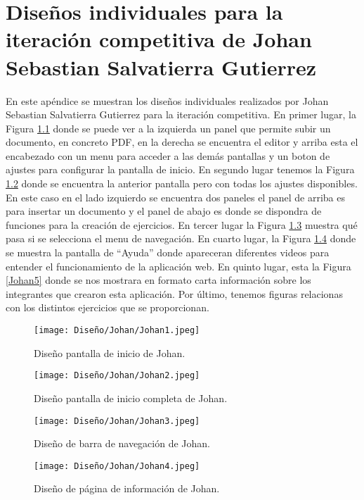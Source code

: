 \chapter{Diseños individuales para la iteración competitiva de Johan Sebastian Salvatierra Gutierrez}
\label{ape:disenyoJohan}

En este apéndice se muestran los diseños individuales realizados por Johan Sebastian Salvatierra Gutierrez para la iteración competitiva. En primer lugar, la Figura \ref{Johan1} donde se puede ver a la izquierda un panel que permite subir un documento, en concreto PDF, en la derecha se encuentra el editor y arriba esta el encabezado con un menu para acceder a las demás pantallas y un boton de ajustes para configurar la pantalla de inicio. En segundo lugar tenemos la Figura \ref{Johan2} donde se encuentra la anterior pantalla pero con todas los ajustes disponibles. En este caso en el lado izquierdo se encuentra dos paneles el panel de arriba es para insertar un documento y el panel de abajo es donde se dispondra de funciones para la creación de ejercicios. En tercer lugar la Figura \ref{Johan3} muestra qué pasa si se selecciona el menu de navegación. En cuarto lugar, la Figura \ref{Johan4} donde se muestra la pantalla de ``Ayuda'' donde apareceran diferentes videos para entender el funcionamiento de la aplicación web. En quinto lugar, esta la Figura \ref{Johan5} donde se nos mostrara en formato carta información sobre los integrantes que crearon esta aplicación. Por último, tenemos figuras relacionas con los distintos ejercicios que se proporcionan.

\begin{figure}[ht!]
  \centering
  \texttt{[image: Diseño/Johan/Johan1.jpeg]}
  \caption{Diseño pantalla de inicio de Johan.}
  \label{Johan1}
\end{figure}

\begin{figure}[ht!]
  \centering
  \texttt{[image: Diseño/Johan/Johan2.jpeg]}
  \caption{Diseño pantalla de inicio completa de Johan.}
  \label{Johan2}
\end{figure}

\begin{figure}[ht!]
  \centering
  \texttt{[image: Diseño/Johan/Johan3.jpeg]}
  \caption{Diseño de barra de navegación de Johan.}
  \label{Johan3}
\end{figure}

\begin{figure}[ht!]
  \centering
  \texttt{[image: Diseño/Johan/Johan4.jpeg]}
  \caption{Diseño de página de información de Johan.}
  \label{Johan4}
\end{figure}

